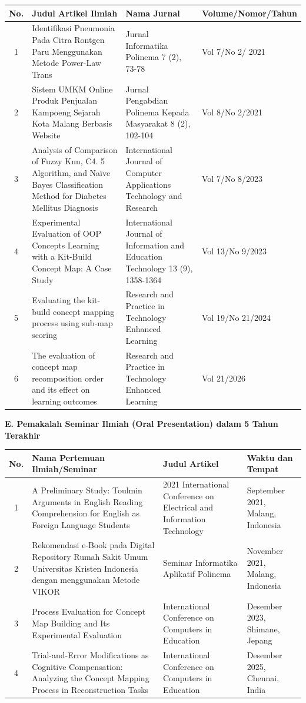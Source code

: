 {\footnotesize
\begin{longtable}{|c|p{6cm}|p{3cm}|p{4cm}|}
\hline
\textbf{No.} & \textbf{Judul Artikel Ilmiah} & \textbf{Nama Jurnal} & \textbf{Volume/Nomor/Tahun} \\
\hline
1 & Identifikasi Pneumonia Pada Citra Rontgen Paru Menggunakan Metode Power-Law Trans & Jurnal Informatika Polinema 7 (2), 73-78 & Vol 7/No 2/ 2021 \\
\hline
2 & Sistem UMKM Online Produk Penjualan Kampoeng Sejarah Kota Malang Berbasis Website & Jurnal Pengabdian Polinema Kepada Masyarakat 8 (2), 102-104 & Vol 8/No 2/2021 \\
\hline
3 & Analysis of Comparison of Fuzzy Knn, C4. 5 Algorithm, and Naïve Bayes Classification Method for Diabetes Mellitus Diagnosis & International Journal of Computer Applications Technology and Research & Vol 7/No 8/2023 \\
\hline
4 & Experimental Evaluation of OOP Concepts Learning with a Kit-Build Concept Map: A Case Study & International Journal of Information and Education Technology 13 (9), 1358-1364 & Vol 13/No 9/2023 \\
\hline
5 & Evaluating the kit-build concept mapping process using sub-map scoring & Research and Practice in Technology Enhanced Learning & Vol 19/No 21/2024 \\
\hline
6 & The evaluation of concept map recomposition order and its effect on learning outcomes & Research and Practice in Technology Enhanced Learning & Vol 21/2026 \\
\hline
\end{longtable}
}

\textbf{E. Pemakalah Seminar Ilmiah (Oral Presentation) dalam 5 Tahun Terakhir}

{\footnotesize
\begin{longtable}{|c|p{5.5cm}|p{5cm}|p{3.5cm}|}
\hline
\textbf{No.} & \textbf{Nama Pertemuan Ilmiah/Seminar} & \textbf{Judul Artikel} & \textbf{Waktu dan Tempat} \\
\hline
1 & A Preliminary Study: Toulmin Arguments in English Reading Comprehension for English as Foreign Language Students & 2021 International Conference on Electrical and Information Technology & September 2021, Malang, Indonesia \\
\hline
2 & Rekomendasi e-Book pada Digital Repository Rumah Sakit Umum Universitas Kristen Indonesia dengan menggunakan Metode VIKOR & Seminar Informatika Aplikatif Polinema & November 2021, Malang, Indonesia \\
\hline
3 & Process Evaluation for Concept Map Building and Its Experimental Evaluation & International Conference on Computers in Education & Desember 2023, Shimane, Jepang \\
\hline
4 & Trial-and-Error Modifications as Cognitive Compensation: Analyzing the Concept Mapping Process in Reconstruction Tasks & International Conference on Computers in Education & Desember 2025, Chennai, India \\
\hline
\end{longtable}
}

